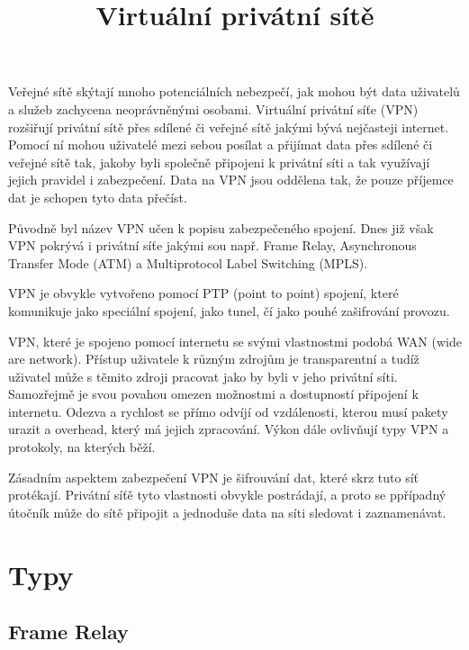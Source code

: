 \documentclass[thesis=B,czech]{FITthesis}[2012/06/26]
\title{Virtuální privátní sítě}
\begin{document}

\begin{introduction}
  \label{sec:uvod}

  Veřejné sítě skýtají mnoho potenciálních nebezpečí, jak mohou být data uživatelů a služeb zachycena neoprávněnými osobami.
  Virtuální privátní síťe (VPN) rozšiřují privátní sítě přes sdílené či veřejné sítě jakými bývá nejčasteji internet.
  Pomocí ní mohou uživatelé mezi sebou posílat a přijímat data přes sdílené či veřejné sítě tak, jakoby byli společně připojeni k privátní síti a tak využívají jejich pravidel i zabezpečení. \cite{cisco_intro}
  Data na VPN jsou oddělena tak, že pouze příjemce dat je schopen tyto data přečíst.  \cite{netgear_vpn_basics}

  Původně byl název VPN učen k popisu zabezpečeného spojení. Dnes již však VPN pokrývá i privátní síťe jakými sou např. Frame Relay, Asynchronous Transfer Mode (ATM) a Multiprotocol Label Switching (MPLS).

  VPN je obvykle vytvořeno pomocí PTP (point to point) spojení, které komunikuje jako speciální spojení, jako tunel, čí jako pouhé zašifrování provozu.

  VPN, které je spojeno pomocí internetu se svými vlastnostmi podobá WAN (wide are network). Přístup uživatele k různým zdrojům je transparentní a tudíž uživatel může s těmito zdroji pracovat jako by byli v jeho privátní síti. Samozřejmě je svou povahou omezen možnostmi a dostupností připojení k internetu. Odezva a rychlost se přímo odvíjí od vzdálenosti, kterou musí pakety urazit a overhead, který má jejich zpracování. Výkon dále ovlivňují typy VPN a protokoly, na kterých běží. \cite{microsoft_intro}

  Zásadním aspektem zabezpečení VPN je šifrouvání dat, které skrz tuto síť protékají. Privátní síťě tyto vlastnosti obvykle postrádají, a proto se ppřípadný útočník může do sítě připojit a jednoduše data na síti sledovat i zaznamenávat. \cite{netgear_vpn_basics}

\end{introduction}

\chapter{Typy}

  \section{Frame Relay}
\end{document}
